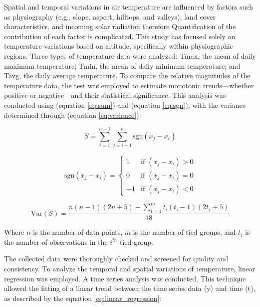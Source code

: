 Spatial and temporal variations in air temperature are influenced by factors such as physiography (e.g., slope, aspect, hilltops, and valleys), land cover characteristics, and incoming solar radiation therefore Quantification of the contribution of each factor is complicated. This study has focused solely on temperature variations based on altitude, specifically within physiographic regions. Three types of temperature data were analyzed: Tmax, the mean of daily maximum temperature; Tmin, the mean of daily minimum temperature; and Tavg, the daily average temperature. To compare the relative magnitudes of the temperature data, the \textcite{mann_nonparametric_1945,kendall_rank_1949} test was employed to estimate monotonic trends—whether positive or negative—and their statistical significance. This analysis was conducted using (equation \ref{eq:sum})  and (equation \ref{eq:sgn}), with the variance determined through (equation \ref{eq:variance}):

\begin{equation} 
  S = \sum_{i=1}^{n-1} \sum_{j=i+1}^{n} \text{sgn}(x_j - x_i) \tag{1} 
  \label{eq:sum}
  \end{equation}
  
\begin{equation}
  \text{sgn}(x_j - x_i) = 
  \begin{cases} 
  1 & \text{if } (x_j - x_i) > 0 \\ 
  0 & \text{if } (x_j - x_i) = 0 \\ 
  -1 & \text{if } (x_j - x_i) < 0 
  \end{cases} \tag{2} 
  \label{eq:sgn}
  \end{equation}
  
\begin{equation}
  \text{Var}(S) = \frac{n(n-1)(2n+5) - \sum_{i=1}^{m} t_i(t_i-1)(2t_i+5)}{18} \tag{3}
  \label{eq:variance}
  \end{equation}

Where \( n \) is the number of data points, \( m \) is the number of tied groups, and \( t_i \) is the number of observations in the \( i^{th} \) tied group.

The collected data were thoroughly checked and screened for quality and consistency. To analyze the temporal and spatial variations of temperature, linear regression was employed. A time series analysis was conducted. This technique allowed the fitting of a linear trend between the time series data (y) and time (t), as described by the equation \ref{eq:linear_regression}:

